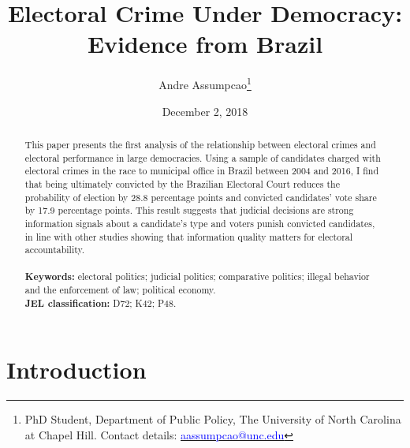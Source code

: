 \documentclass[11pt]{article}
\begin{document}
\begin{titlepage}
\title{Electoral Crime Under Democracy: Evidence from Brazil}
\author{Andre Assumpcao\thanks{PhD Student, Department of Public Policy, The University of North Carolina at Chapel Hill. Contact details: \href{mailto:aassumpcao@unc.edu}{\textcolor{blue}{aassumpcao@unc.edu}}}}
\date{December 2, 2018}

\maketitle

\begin{abstract}
\noindent This paper presents the first analysis of the relationship between electoral crimes and electoral performance in large democracies. Using a sample of candidates charged with electoral crimes in the race to municipal office in Brazil between 2004 and 2016, I find that being ultimately convicted by the Brazilian Electoral Court reduces the probability of election by 28.8 percentage points and convicted candidates' vote share by 17.9 percentage points. This result suggests that judicial decisions are strong information signals about a candidate's type and voters punish convicted candidates, in line with other studies showing that information quality matters for electoral accountability. \\
\vspace{0in} \\
\noindent\textbf{Keywords:} electoral politics; judicial politics; comparative politics; illegal behavior and the enforcement of law; political economy. \\

\noindent\textbf{JEL classification:} D72; K42; P48. \\
\vspace{0in}
\bigskip

\end{abstract}

\setcounter{page}{0}

\thispagestyle{empty}

\end{titlepage}

\clearpage

\section{Introduction} \label{sec:introduction_paper1}
\end{document}
